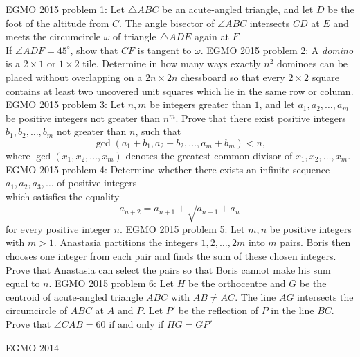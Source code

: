 EGMO 2015 problem 1:  Let $\triangle ABC$ be an acute-angled triangle, and let $D$ be the foot of the altitude from $C.$ The angle bisector of $\angle ABC$ intersects $CD$ at $E$ and meets the circumcircle $\omega$ of triangle $\triangle ADE$ again at $F.$ \\
If $\angle ADF = 45^{\circ}$, show that $CF$ is tangent to $\omega .$ 
EGMO 2015 problem 2:  A \textit{domino} is a $2 \times 1$ or $1 \times  2$ tile. Determine in how many ways exactly $n^2$ dominoes can be placed without overlapping on a $2n \times  2n$ chessboard so that every $2 \times  2$ square contains at least two uncovered unit squares which lie in the same row or column. 
EGMO 2015 problem 3:  Let $n, m$ be integers greater than $1$, and let $a_1, a_2, \dots, a_m$ be positive integers not greater than $n^m$. Prove that there exist positive integers $b_1, b_2, \dots, b_m$ not greater than $n$, such that
\[ \gcd(a_1 + b_1, a_2 + b_2, \dots, a_m + b_m) < n, \]
where $\gcd(x_1, x_2, \dots, x_m)$ denotes the greatest common divisor of $x_1, x_2, \dots, x_m$. 
EGMO 2015 problem 4:  Determine whether there exists an infinite sequence $a_1, a_2, a_3, \dots$ of positive integers \\
which satisfies the equality
\[ a_{n+2}=a_{n+1}+\sqrt{a_{n+1}+a_n} \]
for every positive integer $n$. 
EGMO 2015 problem 5:  Let $m, n$ be positive integers with $m > 1$. Anastasia partitions the integers $1, 2, \dots , 2m$ into $m$ pairs. Boris then chooses one integer from each pair and finds the sum of these chosen integers. \\
Prove that Anastasia can select the pairs so that Boris cannot make his sum equal to $n$. 
EGMO 2015 problem 6:  Let $H$ be the orthocentre and $G$ be the centroid of acute-angled triangle $ABC$ with $AB\ne AC$. The line $AG$ intersects the circumcircle of $ABC$ at $A$ and $P$. Let $P'$ be the reflection of $P$ in the line $BC$. Prove that $\angle CAB = 60$ if and only if $HG = GP'$ 

EGMO 2014 

